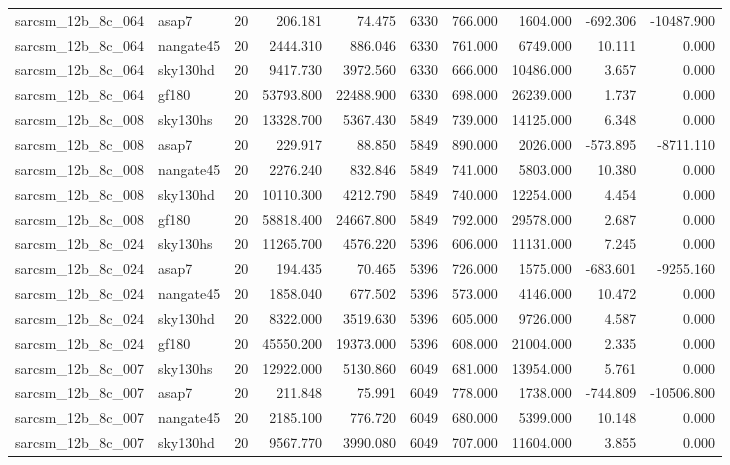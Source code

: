 \begin{longtable}{llrrrrrrrr}
sarcsm\_12b\_8c\_064 & asap7 & 20 & 206.181 & 74.475 & 6330 & 766.000 & 1604.000 & -692.306 & -10487.900 \\
sarcsm\_12b\_8c\_064 & nangate45 & 20 & 2444.310 & 886.046 & 6330 & 761.000 & 6749.000 & 10.111 & 0.000 \\
sarcsm\_12b\_8c\_064 & sky130hd & 20 & 9417.730 & 3972.560 & 6330 & 666.000 & 10486.000 & 3.657 & 0.000 \\
sarcsm\_12b\_8c\_064 & gf180 & 20 & 53793.800 & 22488.900 & 6330 & 698.000 & 26239.000 & 1.737 & 0.000 \\
sarcsm\_12b\_8c\_008 & sky130hs & 20 & 13328.700 & 5367.430 & 5849 & 739.000 & 14125.000 & 6.348 & 0.000 \\
sarcsm\_12b\_8c\_008 & asap7 & 20 & 229.917 & 88.850 & 5849 & 890.000 & 2026.000 & -573.895 & -8711.110 \\
sarcsm\_12b\_8c\_008 & nangate45 & 20 & 2276.240 & 832.846 & 5849 & 741.000 & 5803.000 & 10.380 & 0.000 \\
sarcsm\_12b\_8c\_008 & sky130hd & 20 & 10110.300 & 4212.790 & 5849 & 740.000 & 12254.000 & 4.454 & 0.000 \\
sarcsm\_12b\_8c\_008 & gf180 & 20 & 58818.400 & 24667.800 & 5849 & 792.000 & 29578.000 & 2.687 & 0.000 \\
sarcsm\_12b\_8c\_024 & sky130hs & 20 & 11265.700 & 4576.220 & 5396 & 606.000 & 11131.000 & 7.245 & 0.000 \\
sarcsm\_12b\_8c\_024 & asap7 & 20 & 194.435 & 70.465 & 5396 & 726.000 & 1575.000 & -683.601 & -9255.160 \\
sarcsm\_12b\_8c\_024 & nangate45 & 20 & 1858.040 & 677.502 & 5396 & 573.000 & 4146.000 & 10.472 & 0.000 \\
sarcsm\_12b\_8c\_024 & sky130hd & 20 & 8322.000 & 3519.630 & 5396 & 605.000 & 9726.000 & 4.587 & 0.000 \\
sarcsm\_12b\_8c\_024 & gf180 & 20 & 45550.200 & 19373.000 & 5396 & 608.000 & 21004.000 & 2.335 & 0.000 \\
sarcsm\_12b\_8c\_007 & sky130hs & 20 & 12922.000 & 5130.860 & 6049 & 681.000 & 13954.000 & 5.761 & 0.000 \\
sarcsm\_12b\_8c\_007 & asap7 & 20 & 211.848 & 75.991 & 6049 & 778.000 & 1738.000 & -744.809 & -10506.800 \\
sarcsm\_12b\_8c\_007 & nangate45 & 20 & 2185.100 & 776.720 & 6049 & 680.000 & 5399.000 & 10.148 & 0.000 \\
sarcsm\_12b\_8c\_007 & sky130hd & 20 & 9567.770 & 3990.080 & 6049 & 707.000 & 11604.000 & 3.855 & 0.000 \\

\end{longtable}
